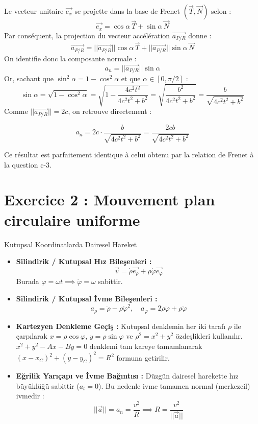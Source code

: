\documentclass[11pt,a4paper]{article}
\begin{document}
Le vecteur unitaire $\vec{e_x}$ se projette dans la base de Frenet $(\vec{T}, \vec{N})$ selon :
$$ \vec{e_x} = \cos\alpha \, \vec{T} + \sin\alpha \, \vec{N} $$
Par conséquent, la projection du vecteur accélération $\vec{a_{P/R}}$ donne :
$$ \vec{a_{P/R}} = ||\vec{a_{P/R}}||\cos\alpha \, \vec{T} + ||\vec{a_{P/R}}||\sin\alpha \, \vec{N} $$
On identifie donc la composante normale :
$$ a_n = ||\vec{a_{P/R}}|| \sin\alpha $$
Or, sachant que $\sin^2\alpha = 1 - \cos^2\alpha$ et que $\alpha \in [0, \pi/2]$ :
$$ \sin\alpha = \sqrt{1 - \cos^2\alpha} = \sqrt{1 - \frac{4c^2 t^2}{4c^2 t^2 + b^2}} = \sqrt{\frac{b^2}{4c^2 t^2 + b^2}} = \frac{b}{\sqrt{4c^2 t^2 + b^2}} $$
Comme $||\vec{a_{P/R}}|| = 2c$, on retrouve directement :
\begin{sonucbox}
$$ a_n = 2c \cdot \frac{b}{\sqrt{4c^2 t^2 + b^2}} = \frac{2cb}{\sqrt{4c^2 t^2 + b^2}} $$
\end{sonucbox}
Ce résultat est parfaitement identique à celui obtenu par la relation de Frenet à la question c-3.

\newpage

\section*{Exercice 2 : Mouvement plan circulaire uniforme}

\begin{theoriebox}{Kutupsal Koordinatlarda Dairesel Hareket}
\begin{itemize}
    \item \textbf{Silindirik / Kutupsal Hız Bileşenleri :}
    $$ \vec{v} = \dot{\rho} \vec{e_\rho} + \rho\dot{\varphi} \vec{e_\varphi} $$
    Burada $\varphi = \omega t \implies \dot{\varphi} = \omega$ sabittir.
    \item \textbf{Silindirik / Kutupsal İvme Bileşenleri :}
    $$ a_\rho = \ddot{\rho} - \rho\dot{\varphi}^2, \quad a_\varphi = 2\dot{\rho}\dot{\varphi} + \rho\ddot{\varphi} $$
    \item \textbf{Kartezyen Denkleme Geçiş :}
    Kutupsal denklemin her iki tarafı $\rho$ ile çarpılarak $x = \rho\cos\varphi$, $y = \rho\sin\varphi$ ve $\rho^2 = x^2 + y^2$ özdeşlikleri kullanılır. $x^2 + y^2 - Ax - By = 0$ denklemi tam kareye tamamlanarak $(x-x_C)^2 + (y-y_C)^2 = R^2$ formuna getirilir.
    \item \textbf{Eğrilik Yarıçapı ve İvme Bağıntısı :}
    Düzgün dairesel harekette hız büyüklüğü sabittir ($a_t = 0$). Bu nedenle ivme tamamen normal (merkezcil) ivmedir :
    $$ ||\vec{a}|| = a_n = \frac{v^2}{R} \implies R = \frac{v^2}{||\vec{a}||} $$
\end{itemize}
\end{theoriebox}
\end{document}

